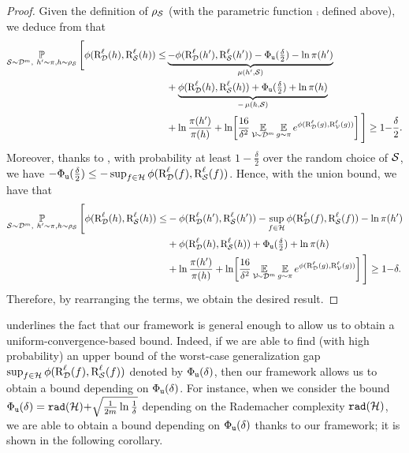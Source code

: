 \documentclass[twoside]{article}
\theoremstyle{plain}
\begin{document}
\begin{proof}
Given the definition of $\rho_{\mathcal{S}}$ (with the parametric function $\comp$ defined above), we deduce from  that 
\begin{align*}
    \operatorname*{\mathbb{P}}_{\mathcal{S}\sim\mathcal{D}^m,\ h'\sim\pi, h\sim\rho_{\mathcal{S}}}\Bigg[ \phi(\text{R}^{\ell}_{\mathcal{D}}(h), \text{R}^{\ell}_{\mathcal{S}}(h)) \le &\underbrace{-\phi(\text{R}^{\ell}_{\mathcal{D}}(h'),\text{R}^{\ell}_{\mathcal{S}}(h'))  -\Phi_{{\tt u}}(\tfrac{\delta}{2}) -\ln\pi(h')}_{\operatorname{\mu}(h', \mathcal{S})}\\
    &+ \underbrace{\phi(\text{R}^{\ell}_{\mathcal{D}}(h),\text{R}^{\ell}_{\mathcal{S}}(h)) + \Phi_{{\tt u}}(\tfrac{\delta}{2}) + \ln\pi(h)}_{-\operatorname{\mu}(h, \mathcal{S})}\\
    &+ \ln\frac{\pi(h')}{\pi(h)} + \ln\!\left[\frac{16}{\delta^2} \operatorname*{\mathbb{E}}_{\mathcal{V}\!{\sim}\mathcal{D}^m}\operatorname*{\mathbb{E}}_{g{\sim}\pi} e^{\phi(\text{R}^{\ell}_{\mathcal{D}}(g),\text{R}^{\ell}_{\mathcal{V}}(g))}\right] \Bigg] \ge 1{-}\frac{\delta}{2}.
\end{align*}
Moreover, thanks to , with probability at least $1{-}\frac{\delta}{2}$ over the random choice of $\mathcal{S}$, we have $-\Phi_{{\tt u}}(\tfrac{\delta}{2}) \le - \sup_{f\in\mathcal{H}}\phi(\text{R}^{\ell}_{\mathcal{D}}(f),\text{R}^{\ell}_{\mathcal{S}}(f))$.
Hence, with the union bound, we have that 
\begin{align*}
    \operatorname*{\mathbb{P}}_{\mathcal{S}\sim\mathcal{D}^m,\ h'\sim\pi, h\sim\rho_{\mathcal{S}}}\Bigg[ \phi(\text{R}^{\ell}_{\mathcal{D}}(h), \text{R}^{\ell}_{\mathcal{S}}(h)) \le &-\phi(\text{R}^{\ell}_{\mathcal{D}}(h'),\text{R}^{\ell}_{\mathcal{S}}(h'))  -\sup_{f\in\mathcal{H}}\phi(\text{R}^{\ell}_{\mathcal{D}}(f),\text{R}^{\ell}_{\mathcal{S}}(f)) -\ln\pi(h')\\
    &+ \phi(\text{R}^{\ell}_{\mathcal{D}}(h),\text{R}^{\ell}_{\mathcal{S}}(h)) + \Phi_{{\tt u}}(\tfrac{\delta}{2}) + \ln\pi(h)\\
    &+ \ln\frac{\pi(h')}{\pi(h)} + \ln\!\left[\frac{16}{\delta^2} \operatorname*{\mathbb{E}}_{\mathcal{V}\!{\sim}\mathcal{D}^m}\operatorname*{\mathbb{E}}_{g{\sim}\pi} e^{\phi(\text{R}^{\ell}_{\mathcal{D}}(g),\text{R}^{\ell}_{\mathcal{V}}(g))}\right] \Bigg] \ge 1{-}\delta.
\end{align*}
Therefore, by rearranging the terms, we obtain the desired result.
\end{proof}

 underlines the fact that our framework is general enough to allow us to obtain a uniform-convergence-based bound.
Indeed, if we are able to find (with high probability) an upper bound of the worst-case generalization gap $\sup_{f\in\mathcal{H}}\phi(\text{R}^{\ell}_{\mathcal{D}}(f),\text{R}^{\ell}_{\mathcal{S}}(f))$ denoted by $\Phi_{{\tt u}}(\delta)$, then our framework allows us to obtain a bound depending on $\Phi_{{\tt u}}(\delta)$.
For instance, when we consider the bound $\Phi_{{\tt u}}(\delta)={\tt rad}(\mathcal{H}) {+} \sqrt{\frac{1}{2m}\ln\frac{1}{\delta}}$ depending on the Rademacher complexity ${\tt rad}(\mathcal{H})$, we are able to obtain a bound depending on $\Phi_{{\tt u}}(\delta)$ thanks to our framework; it is shown in the following corollary.
\end{document}
